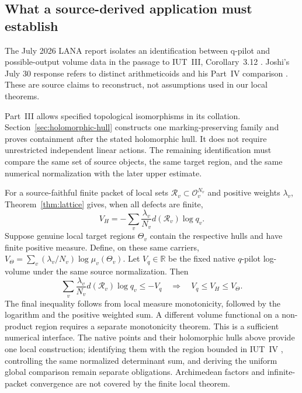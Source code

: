 \documentclass[11pt]{amsart}
\theoremstyle{definition}
\theoremstyle{remark}
\newcommand{\R}{\mathbb R}
\newcommand{\OO}{\mathcal O}
\begin{document}


\subsection{What a source-derived application must establish}
The July 2026 LANA report \cite{LANA} isolates an identification between
q-pilot and possible-output volume data in the passage to IUT~III,
Corollary~3.12 \cite{IUT3}. Joshi's July 30 response \cite{JoshiResponse}
refers to distinct arithmeticoids and his Part~IV comparison
\cite[Theorem~6.10.1]{JoshiIV}. These are source claims to reconstruct,
not assumptions used in our local theorems.

Part~III \cite[Proposition~9.7.5.1]{JoshiIII} allows specified topological
isomorphisms in its collation. Section~\ref{sec:holomorphic-hull} constructs
one marking-preserving family and proves containment after the stated
holomorphic hull. It does not require unrestricted independent linear
actions. The remaining identification must compare the same set of source
objects, the same target region, and the same numerical normalization
with the later upper estimate.

For a source-faithful finite packet of local sets
$\mathcal R_v\subset\OO_v^{N_v}$ and positive weights $\lambda_v$,
Theorem~\ref{thm:lattice} gives, when all defects are finite,
\[
 V_H=-\sum_v\frac{\lambda_v}{N_v}d(\mathcal R_v)\log q_v.
\]
Suppose genuine local target regions $\Theta_v$ contain the respective
hulls and have finite positive measure. Define, on these same carriers,
$V_\Theta=\sum_v(\lambda_v/N_v)\log\mu_v(\Theta_v)$.
Let $V_q\in\R$ be the fixed native $q$-pilot log-volume under the same
source normalization. Then
\[
 \sum_v\frac{\lambda_v}{N_v}d(\mathcal R_v)\log q_v\le -V_q
 \quad\Longrightarrow\quad V_q\le V_H\le V_\Theta.
\]
The final inequality follows from local measure monotonicity, followed by
the logarithm and the positive weighted sum. A different volume functional
on a non-product region requires a separate monotonicity theorem.
This is a sufficient numerical interface. The native points and their
holomorphic hulls above provide one local construction; identifying them
with the region bounded in IUT~IV \cite{IUT4}, controlling the same
normalized determinant sum, and deriving the uniform global comparison
remain separate obligations. Archimedean factors and infinite-packet
convergence are not covered by the finite local theorem.


\end{document}
